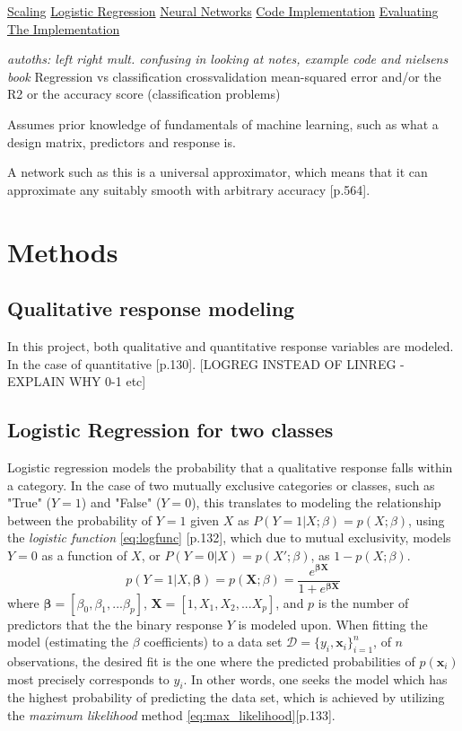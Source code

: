 \documentclass[%
oneside,                 %
final,                   %
10pt]{article}
\begin{document}
\hyperref[Section_M_Scaling]{Scaling}
\hyperref[Section_M_Logreg]{Logistic Regression}
\hyperref[Section_M_NN]{Neural Networks}
\hyperref[Section_M_Codeimpl]{Code Implementation}
\hyperref[Section_M_eval]{Evaluating The Implementation}

\textit{autoths: left right mult. confusing in looking at notes, example code and nielsens book}
Regression vs classification
crossvalidation
mean-squared error and/or the R2
or the accuracy score (classification problems) 

Assumes prior knowledge of fundamentals of machine learning, such as what a design matrix, predictors and response is.

A network such as this is a universal approximator, which means that it can approximate any suitably smooth with arbitrary accuracy \citep{MLMurphy}[p.564].
\section{Methods} \label{Section_Theory}

\subsection{Qualitative response modeling}
In this project, both qualitative and quantitative response variables are modeled.  In the case of quantitative \citep{2017introstatlearn}[p.130]. [LOGREG INSTEAD OF LINREG  -EXPLAIN WHY 0-1 etc]


\subsection{Logistic Regression for two classes} \label{Section_M_Logreg}
Logistic regression models the probability that a qualitative response falls within a category. In the case of two mutually exclusive categories or classes, such as "True" ($Y=1$) and "False" ($Y=0$), this translates to modeling the relationship between the probability of $Y=1$ given $X$ as $P(Y=1|X;\beta)=p(X;\beta)$, using the \textit{logistic function} \eqref{eq:logfunc} \citep{2017introstatlearn}[p.132], which due to mutual exclusivity, models $Y=0$ as a function of $X$, or $P(Y=0|X)=p(X';\beta)$, as $1-p(X;\beta)$.
\begin{equation}
p(Y=1|X, \bm{\beta})= p(\bm{X};{\beta})=\frac{e^{\bm{\beta}\bm{X}}}{1+e^{\bm{\beta}\bm{X}}}
\label{eq:logfunc}
\end{equation}
where $\bm{\beta}=[\beta_0, \beta_1, ... \beta_p]$, $\bm{X}=[1,X_1, X_2, ... X_p]$, and $p$ is the number of predictors that the the binary response $Y$ is modeled upon. When fitting the model (estimating the $\beta$ coefficients) to a data set $\mathcal{D}=\{y_i,\bm{x}_i\}_{i=1}^n$, of $n$ observations, the desired fit is the one where the predicted probabilities of $p(\bm{x}_i)$  most precisely corresponds to $y_i$. In other words, one seeks the model which has the highest probability of predicting the data set, which is achieved by utilizing the \textit{maximum likelihood} method \eqref{eq:max_likelihood}\citep{2017introstatlearn}[p.133]. 
\end{document}
